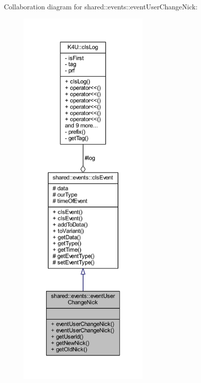 Collaboration diagram for shared\-:\-:events\-:\-:event\-User\-Change\-Nick\-:\nopagebreak
\begin{figure}[H]
\begin{center}
\leavevmode
\includegraphics[height=550pt]{dc/dc8/classshared_1_1events_1_1event_user_change_nick__coll__graph}
\end{center}
\end{figure}
